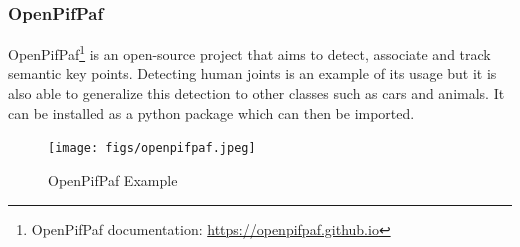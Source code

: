 \subsubsection{OpenPifPaf}

OpenPifPaf\cite{Kreiss2021,Kreiss2019}\footnote{OpenPifPaf documentation: \url{https://openpifpaf.github.io}} is an open-source project that aims to detect, associate and track semantic key points. Detecting human joints is an example of its usage but it is also able to generalize this detection to other classes such as cars and animals. It can be installed as a python package which can then be imported.

\begin{figure}[h]
\centerline{\texttt{[image: figs/openpifpaf.jpeg]}}
\caption[OpenPifPaf Example]{OpenPifPaf Example \cite{Kreiss2021}}
\label{openpifpaf}
\end{figure}

\fi